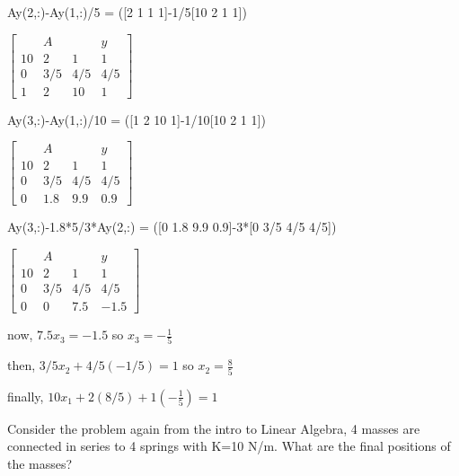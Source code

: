 \documentclass[11pt]{article}
\begin{document}
Ay(2,:)-Ay(1,:)/5 = ({[}2 1 1 1{]}-1/5{[}10 2 1 1{]})

$\left[
\begin{array}{ccc|c}
   & A & & y \\
10 & 2 & 1 & 1\\
0 & 3/5 & 4/5  & 4/5 \\
1 & 2 & 10 & 1\end{array}
\right] $

Ay(3,:)-Ay(1,:)/10 = ({[}1 2 10 1{]}-1/10{[}10 2 1 1{]})

$\left[
\begin{array}{ccc|c}
   & A & & y \\
10 & 2 & 1 & 1\\
0 & 3/5 & 4/5  & 4/5 \\
0 & 1.8 & 9.9 & 0.9\end{array}
\right] $

Ay(3,:)-1.8*5/3*Ay(2,:) = ({[}0 1.8 9.9 0.9{]}-3*{[}0 3/5 4/5 4/5{]})

$\left[
\begin{array}{ccc|c}
   & A & & y \\
10 & 2 & 1 & 1\\
0 & 3/5 & 4/5  & 4/5 \\
0 & 0 & 7.5 & -1.5\end{array}
\right]$

now, \(7.5x_{3}=-1.5\) so \(x_{3}=-\frac{1}{5}\)

then, \(3/5x_{2}+4/5(-1/5)=1\) so \(x_{2}=\frac{8}{5}\)

finally, \(10x_{1}+2(8/5)+1(-\frac{1}{5})=1\)

    Consider the problem again from the intro to Linear Algebra, 4 masses
are connected in series to 4 springs with K=10 N/m. What are the final
positions of the masses?
\end{document}

